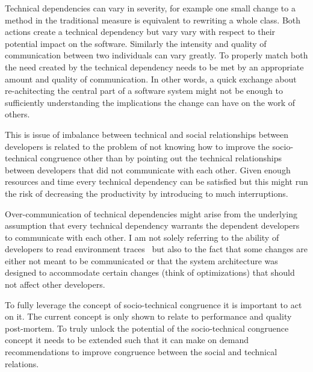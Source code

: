 Technical dependencies can vary in severity, for example one small change to a method in the traditional measure is equivalent to rewriting a whole class.
Both actions create a technical dependency but vary vary with respect to their potential impact on the software.
Similarly the intensity and quality of communication between two individuals can vary greatly.
To properly match both the need created by the technical dependency needs to be met by an appropriate amount and quality of communication.
In other words, a quick exchange about re-achitecting the central part of a software system might not be enough to sufficiently understanding the implications the change can have on the work of others.

This is issue of imbalance between technical and social relationships between developers is related to the problem of not knowing how to improve the socio-technical congruence other than by pointing out the technical relationships between developers that did not communicate with each other.
Given enough resources and time every technical dependency can be satisfied but this might run the risk of decreasing the productivity by introducing to much interruptions.

Over-communication of technical dependencies might arise from the underlying assumption that every technical dependency warrants the dependent developers to communicate with each other.
I am not solely referring to the ability of  developers to read environment traces~\cite{bolici:stc:2009} but also to the fact that some changes are either not meant to be communicated or that the system architecture was designed to accommodate certain changes (think of optimizations) that should not affect other developers.

To fully leverage the concept of socio-technical congruence it is important to act on it.
The current concept is only shown to relate to performance and quality post-mortem.
To truly unlock the potential of the socio-technical congruence concept it needs to be extended such that it can make on demand recommendations to improve congruence between the social and technical relations.

